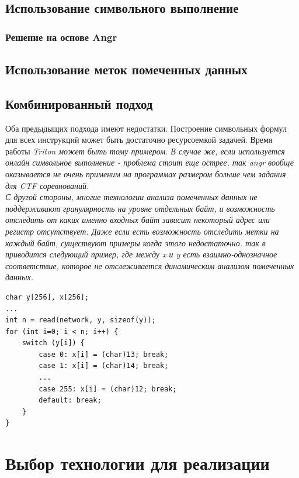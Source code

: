 
\section{Использование символьного выполнение}

\subsection{Решение на основе Angr}


\section{Использование меток помеченных данных}

\section{Комбинированный подход}

Оба предыдыщих подхода имеют недостатки. Построение символьных формул для всех инструкций может быть достаточно ресурсоемкой задачей. Время работы \em{Triton} может быть тому примером. В случае же, если используется онлайн символьное выполнение - проблема стоит еще острее, так \em{angr} вообще оказывается не очень применим на программах размером больше чем задания для CTF соревнований.
\\
С другой стороны, многие технологии анализа помеченных данных не поддерживают гранулярность на уровне отдельных байт, и возможность отследить от каких именно входных байт зависит некоторый адрес или регистр отсутствует. Даже если есть возможность отследить метки на каждый байт, существуют примеры когда этого недостаточно. так в \cite{Cavallaro07anti-taint-analysis:practical} приводится следующий пример, где между x и y есть взаимно-однозначное соответствие, которое не отслеживается динамическим анализом помеченных данных.
\\

\begin{lstlisting}[environoment=C_LANG]
char y[256], x[256];
...
int n = read(network, y, sizeof(y));
for (int i=0; i < n; i++) {
    switch (y[i]) {
        case 0: x[i] = (char)13; break;
        case 1: x[i] = (char)14; break;
        ...
        case 255: x[i] = (char)12; break;
        default: break;
    }
}
\end{lstlisting}

\chapter{Выбор технологии для реализации}


